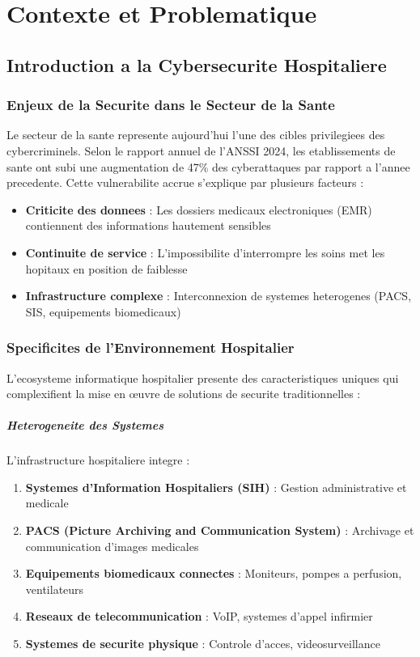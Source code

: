 \chapter{Contexte et Problematique}

\section{Introduction a la Cybersecurite Hospitaliere}

\subsection{Enjeux de la Securite dans le Secteur de la Sante}

Le secteur de la sante represente aujourd'hui l'une des cibles privilegiees des cybercriminels. Selon le rapport annuel de l'ANSSI 2024, les etablissements de sante ont subi une augmentation de 47\% des cyberattaques par rapport a l'annee precedente. Cette vulnerabilite accrue s'explique par plusieurs facteurs :

\begin{itemize}
    \item \textbf{Criticite des donnees} : Les dossiers medicaux electroniques (EMR) contiennent des informations hautement sensibles
    \item \textbf{Continuite de service} : L'impossibilite d'interrompre les soins met les hopitaux en position de faiblesse
    \item \textbf{Infrastructure complexe} : Interconnexion de systemes heterogenes (PACS, SIS, equipements biomedicaux)
\end{itemize}

\subsection{Specificites de l'Environnement Hospitalier}

L'ecosysteme informatique hospitalier presente des caracteristiques uniques qui complexifient la mise en œuvre de solutions de securite traditionnelles :

\paragraph{Heterogeneite des Systemes}
L'infrastructure hospitaliere integre :
\begin{enumerate}
    \item \textbf{Systemes d'Information Hospitaliers (SIH)} : Gestion administrative et medicale
    \item \textbf{PACS (Picture Archiving and Communication System)} : Archivage et communication d'images medicales
    \item \textbf{Equipements biomedicaux connectes} : Moniteurs, pompes a perfusion, ventilateurs
    \item \textbf{Reseaux de telecommunication} : VoIP, systemes d'appel infirmier
    \item \textbf{Systemes de securite physique} : Controle d'acces, videosurveillance
\end{enumerate}

